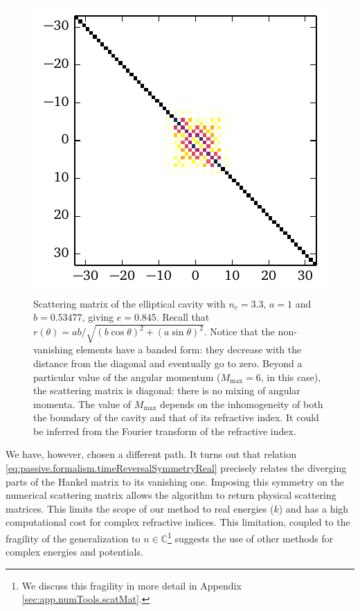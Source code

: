 \begin{figure}
 \centering
 \includegraphics{figs/passive/sMatrixEllipseMag.pdf}
 \caption[Banded form of the scattering matrix of the elliptical cavity]
	 {Scattering matrix of the elliptical cavity with $n_c=3.3$, $a=1$
	 and $b=0.53477$, giving $e=0.845$. Recall that $r(\theta)=ab/\sqrt{(b\cos\theta)^2+(a\sin\theta)^2}$.
	 Notice that the non-vanishing elements have a banded form: they decrease with the distance
	 from the diagonal and eventually go to zero. Beyond a particular value of the angular momentum 
	 ($M_\text{max}=6$, in this case), the scattering matrix is diagonal: there is no mixing of angular momenta.
	 The value of $M_\text{max}$ depends on the inhomogeneity of both the boundary of the cavity and that of its
	 refractive index. It could be inferred from the Fourier transform of the refractive index.}
 \label{fig:passive.numerical.bandedFormSmatrix}
\end{figure}

We have, however, chosen a different path. 
It turns out that relation \eqref{eq:passive.formalism.timeReversalSymmetryReal}
precisely relates the diverging parts of the Hankel matrix
to its vanishing one. Imposing this symmetry on the numerical scattering
matrix allows the algorithm to return physical scattering matrices. 
This limits the scope of our method to real energies ($k$) and has a
high computational cost for complex refractive indices. This limitation, 
coupled to the fragility of the generalization to $n\in\mathbb{C}$\footnote{
We discuss this fragility in more detail in Appendix \ref{sec:app.numTools.scatMat}.} suggests
the use of other methods for complex energies and potentials.

